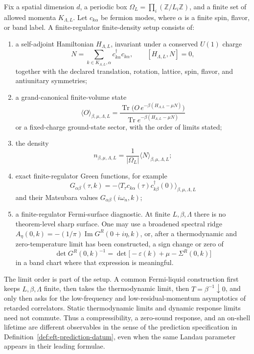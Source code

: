 \begin{definition}
\label{def:finite-density-fermi-regulator-datum}
Fix a spatial dimension \(d\), a periodic box
\(\Omega_L=\prod_i(\mathbb Z/L_i\mathbb Z)\), and a finite set of allowed
momenta \(K_{\Lambda,L}\).  Let \(c_{k\alpha}\) be fermion modes, where
\(\alpha\) is a finite spin, flavor, or band label.  A finite-regulator
finite-density setup consists of:
\begin{enumerate}
  \item a self-adjoint Hamiltonian \(H_{\Lambda,L}\), invariant under a conserved
  \(U(1)\) charge
  \[
    N=\sum_{k\in K_{\Lambda,L},\alpha}c^\dagger_{k\alpha}c_{k\alpha},
    \qquad [H_{\Lambda,L},N]=0,
  \]
  together with the declared translation, rotation, lattice, spin, flavor, and
  antiunitary symmetries;
  \item a grand-canonical finite-volume state
  \[
    \langle O\rangle_{\beta,\mu,\Lambda,L}
    =
    \frac{\operatorname{Tr}\bigl(
      O\,e^{-\beta(H_{\Lambda,L}-\mu N)}
    \bigr)}
    {\operatorname{Tr}e^{-\beta(H_{\Lambda,L}-\mu N)}}
  \]
  or a fixed-charge ground-state sector, with the order of limits stated;
  \item the density
  \[
    n_{\beta,\mu,\Lambda,L}
    =
    \frac{1}{|\Omega_L|}
    \langle N\rangle_{\beta,\mu,\Lambda,L};
  \]
  \item exact finite-regulator Green functions, for example
  \[
    G_{\alpha\beta}(\tau,k)
    =
    -\langle T_\tau c_{k\alpha}(\tau)c^\dagger_{k\beta}(0)
      \rangle_{\beta,\mu,\Lambda,L}
  \]
  and their Matsubara values \(G_{\alpha\beta}(i\omega_n,k)\);
  \item a finite-regulator Fermi-surface diagnostic.  At finite
  \(L,\beta,\Lambda\) there is no theorem-level sharp surface.  One may use a
  broadened spectral ridge
  \(A_\eta(0,k)=-(1/\pi)\operatorname{Im}G^R(0+i\eta,k)\), or, after a
  thermodynamic and zero-temperature limit has been constructed, a sign change
  or zero of
  \[
    \det G^R(0,k)^{-1}
    =
    \det\bigl[-\varepsilon(k)+\mu-\Sigma^R(0,k)\bigr]
  \]
  in a band chart where that expression is meaningful.
\end{enumerate}
\end{definition}

The limit order is part of the setup.  A common Fermi-liquid construction first
keeps \(L,\beta,\Lambda\) finite, then takes the thermodynamic limit, then
\(T=\beta^{-1}\downarrow0\), and only then asks for the low-frequency and
low-residual-momentum asymptotics of retarded correlators.  Static
thermodynamic limits and dynamic response limits need not commute.  Thus a
compressibility, a zero-sound response, and an on-shell lifetime are different
observables in the sense of the prediction specification in
Definition~\ref{def:eft-prediction-datum}, even
when the same Landau parameter appears in their leading formulae.

